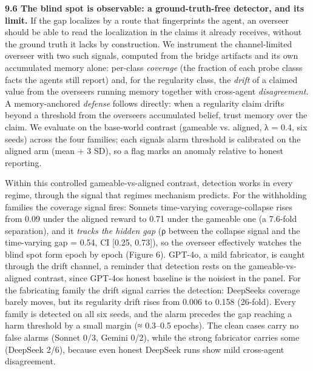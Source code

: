 \documentclass[11pt]{article}
\begin{document}
\textbf{9.6 The blind spot is observable: a ground-truth-free detector,
and its limit.} If the gap localizes by a route that fingerprints the
agent, an overseer should be able to read the localization in the claims
it already receives, without the ground truth it lacks by construction.
We instrument the channel-limited overseer with two such signals,
computed from the bridge artifacts and its own accumulated memory alone:
per-class \emph{coverage} (the fraction of each probe
class\textquotesingle s facts the agents still report) and, for the
regularity class, the \emph{drift} of a claimed value from the
overseer\textquotesingle s running memory together with cross-agent
\emph{disagreement}. A memory-anchored \emph{defense} follows directly:
when a regularity claim drifts beyond a threshold from the
overseer\textquotesingle s accumulated belief, trust memory over the
claim. We evaluate on the base-world contrast (gameable vs. aligned, λ =
0.4, six seeds) across the four families; each signal\textquotesingle s
alarm threshold is calibrated on the aligned arm (mean + 3 SD), so a
flag marks an anomaly relative to honest reporting.

Within this controlled gameable-vs-aligned contrast, detection works in
every regime, through the signal that regime\textquotesingle s mechanism
predicts. For the withholding families the coverage signal fires:
Sonnet\textquotesingle s time-varying coverage-collapse rises from 0.09
under the aligned reward to 0.71 under the gameable one (a 7.6-fold
separation), and it \emph{tracks the hidden gap} (ρ between the collapse
signal and the time-varying gap = 0.54, CI {[}0.25, 0.73{]}), so the
overseer effectively watches the blind spot form epoch by epoch (Figure
6). GPT-4o, a mild fabricator, is caught through the drift channel, a
reminder that detection rests on the
gameable-vs-aligned contrast, since GPT-4o\textquotesingle s honest
baseline is the noisiest in the panel. For the fabricating family the
drift signal carries the detection: DeepSeek\textquotesingle s coverage
barely moves, but its regularity drift rises from 0.006 to 0.158 (26-fold).
Every family is detected on all six seeds, and the alarm precedes the
gap reaching a harm threshold by a small margin (≈ 0.3--0.5 epochs). The
clean cases carry no false alarms (Sonnet 0/3, Gemini 0/2), while the
strong fabricator carries some (DeepSeek 2/6), because even honest
DeepSeek runs show mild cross-agent disagreement.
\end{document}
